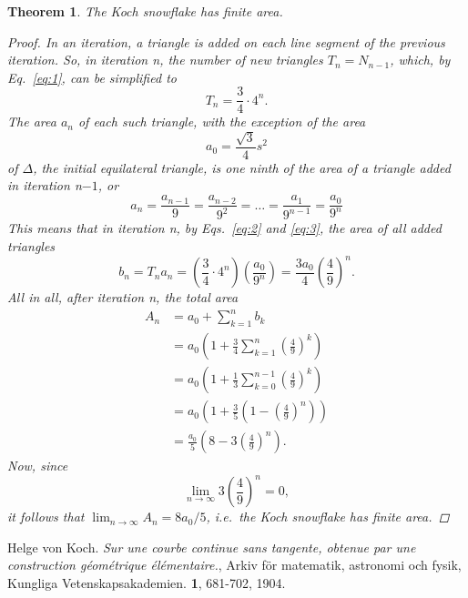 \documentclass[12pt,a4paper]{article}
\newtheorem{theorem}{Theorem}
\begin{document}
	\begin{theorem}
	The Koch snowflake has finite area.
		\begin{proof}
			In an iteration, a triangle is added on each line segment of the previous iteration.
			So, in iteration \textit{n}, the number of new triangles $T_n=N_{n-1}$, which, by
			Eq.~\ref{eq:1}, can be simplified to 
			  \begin{equation}
			   	\label{eq:2}
			   	T_n =\frac{3}{4} \cdot 4^n .
			  \end{equation}
			   The area $a_n$ of each such triangle, with the exception of the area
			 \begin{displaymath}
				a_0=\frac{\sqrt{3}}{4}s^2
			 \end{displaymath}
			 of $\Delta$, the initial equilateral triangle, is one ninth of the area of a triangle added in iteration
			 \textit{n}$- 1$, or				
			\begin{equation}
				\label{eq:3}
				a_n=\frac{a_{n-1}}{9}=\frac{a_{n-2}}{9^2}=\ldots=\frac{a_{1}}{9^{n-1}}=\frac{a_{0}}{9^n}
			 \end{equation}
			 This means that in iteration \textit{n}, by Eqs.~\ref{eq:2} and \ref{eq:3}, the area of all added triangles 
			 \begin{displaymath}
				b_n=T_ {n}a_{n}=\left(\frac{3}{4}\cdot4^n\right)\left(\frac{a_0}{9^n}\right)=\frac{3a_0}{4}\left(\frac{4}{9}\right)^n.
			 \end{displaymath}
			   All in all, after iteration \textit{n}, the total area
			  \begin{align*}
			           A_n &= a_0 + \sum_{k=1}^n b_k \\
			           &=a_0\left(1+\frac{3}{4}\sum_{k=1}^n\left(\frac{4}{9}\right)^k \right) \\
				&=a_0\left(1+\frac{1}{3}\sum_{k=0}^{n-1}\left(\frac{4}{9}\right)^k \right) \\
				&=a_0\left(1+\frac{3}{5}\left(1-\left(\frac{4}{9}\right)^n\right)\right)\\
				&=\frac{a_0}{5}\left(8-3\left(\frac{4}{9}\right)^n \right).
			   \end{align*}
			  Now, since
			\begin{displaymath}
			   \lim_{n \to \infty}3\left(\frac{4}{9}\right)^n=0,
			\end{displaymath}
			 it follows that $\lim_{n \to \infty}A_n=8a_0/5$, i.e.\ the Koch snowflake has finite area.  
		\end{proof}
	\end{theorem}
	
	
	\begin{thebibliography}{99}
	   Helge von Koch. 
	    \emph{Sur une courbe continue sans tangente, obtenue par une
	    construction géométrique élémentaire.}, 
	    Arkiv för matematik, astronomi och fysik, 
	    Kungliga Vetenskapsakademien. 
	    \textbf{1}, 681-702, 1904.
	\end{thebibliography}
\end{document}
